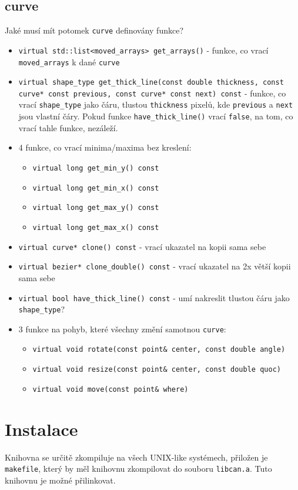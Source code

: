 \documentclass[11pt]{article} %
\begin{document}
\subsection{curve}
Jaké musí mít potomek \texttt{curve} definovány funkce?
\begin{itemize}
    \item \texttt{virtual std::list<moved\_arrays> get\_arrays()} - funkce, co vrací \texttt{moved\_arrays} k dané \texttt{curve}
    \item \texttt{virtual shape\_type get\_thick\_line(const double thickness, const curve* const previous, const curve* const next) const} - funkce, co vrací \texttt{shape\_type} jako čáru, tlustou \texttt{thickness} pixelů, kde \texttt{previous} a \texttt{next} jsou vlastní čáry. Pokud funkce \texttt{have\_thick\_line()} vrací \texttt{false}, na tom, co vrací tahle funkce, nezáleží.
    \item 4 funkce, co vrací minima/maxima bez kreslení:
    \begin{itemize}
        \item \texttt{virtual long get\_min\_y() const}
        \item \texttt{virtual long get\_min\_x() const}
        \item \texttt{virtual long get\_max\_y() const}
        \item \texttt{virtual long get\_max\_x() const}
    \end{itemize}
    \item \texttt{virtual curve* clone() const} - vrací ukazatel na kopii sama sebe
    \item \texttt{virtual bezier* clone\_double() const} - vrací ukazatel na 2x větší kopii sama sebe
    \item \texttt{virtual bool have\_thick\_line() const} - umí nakreslit tlustou čáru jako \texttt{shape\_type}?
    \item 3 funkce na pohyb, které všechny změní samotnou \texttt{curve}:
    \begin{itemize}
        \item \texttt{virtual void rotate(const point\& center, const double angle)}
		\item \texttt{virtual void resize(const point\& center, const double quoc)}
		\item \texttt{virtual void move(const point\& where)}
    \end{itemize}
\end{itemize}


\section{Instalace}
Knihovna se určitě zkompiluje na všech UNIX-like systémech, přiložen je \texttt{makefile}, který by měl knihovnu zkompilovat do souboru \texttt{libcan.a}. Tuto knihovnu je možné  přilinkovat.
\end{document}
